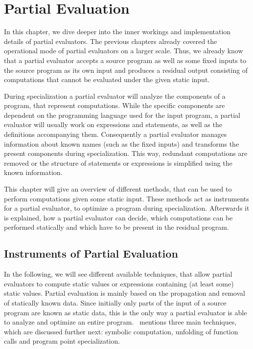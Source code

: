 
\section{Partial Evaluation}\label{sec:partial-evaluation}

In this chapter, we dive deeper into the inner workings and implementation details of partial evaluators.
The previous chapters already covered the operational mode of partial evaluators on a larger scale.
Thus, we already know that a partial evaluator accepts a source program as well as some fixed inputs to the source program as its own input and produces a residual output consisting of computations that cannot be evaluated under the given static input.

During specialization a partial evaluator will analyze the components of a program, that represent computations.
While the specific components are dependent on the programming language used for the input program, a partial evaluator will usually work on expressions and statements, as well as the definitions accompanying them.
Consequently a partial evaluator manages information about known names (such as the fixed inputs) and transforms the present components during specialization.
This way, redundant computations are removed or the structure of statements or expressions is simplified using the known information.

This chapter will give an overview of different methods, that can be used to perform computations given some static input.
These methods act as instruments for a partial evaluator, to optimize a program during specialization.
Afterwards it is explained, how a partial evaluator can decide, which computations can be performed statically and which have to be present in the residual program.


\subsection{Instruments of Partial Evaluation}\label{sec:pe-instruments}

In the following, we will see different available techniques, that allow partial evaluators to compute static values or expressions containing (at least some) static values.
Partial evaluation is mainly based on the propagation and removal of statically known data.
Since initially only parts of the input of a source program are known as static data, this is the only way a partial evaluator is able to analyze and optimize an entire program.
\cite[Chap. 1]{Jones_PartialEvaluation}~mentions three main techniques, which are discussed further next: symbolic computation, unfolding of function calls and program point specialization.

